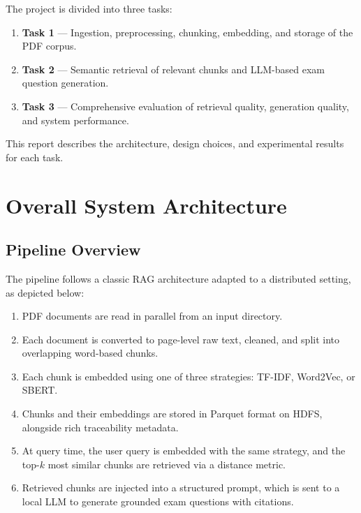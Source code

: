 \documentclass[a4paper,11pt]{article}
\begin{document}
The project is divided into three tasks:
\begin{enumerate}[noitemsep]
  \item \textbf{Task 1} — Ingestion, preprocessing, chunking, embedding, and
        storage of the PDF corpus.
  \item \textbf{Task 2} — Semantic retrieval of relevant chunks and LLM-based
        exam question generation.
  \item \textbf{Task 3} — Comprehensive evaluation of retrieval quality,
        generation quality, and system performance.
\end{enumerate}

This report describes the architecture, design choices, and experimental
results for each task.

\section{Overall System Architecture}

\subsection{Pipeline Overview}

The pipeline follows a classic RAG architecture adapted to a distributed
setting, as depicted below:

\begin{enumerate}[noitemsep]
  \item PDF documents are read in parallel from an input directory.
  \item Each document is converted to page-level raw text, cleaned, and
        split into overlapping word-based chunks.
  \item Each chunk is embedded using one of three strategies: TF-IDF,
        Word2Vec, or SBERT.
  \item Chunks and their embeddings are stored in Parquet format on HDFS,
        alongside rich traceability metadata.
  \item At query time, the user query is embedded with the same strategy,
        and the top-$k$ most similar chunks are retrieved via a distance
        metric.
  \item Retrieved chunks are injected into a structured prompt, which is
        sent to a local LLM to generate grounded exam questions with
        citations.
\end{enumerate}
\end{document}
